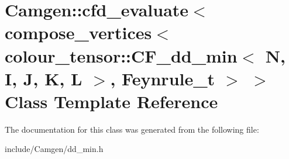 \hypertarget{a00049}{\section{Camgen\-:\-:cfd\-\_\-evaluate$<$ compose\-\_\-vertices$<$ colour\-\_\-tensor\-:\-:C\-F\-\_\-dd\-\_\-min$<$ N, I, J, K, L $>$, Feynrule\-\_\-t $>$ $>$ Class Template Reference}
\label{a00049}
}


The documentation for this class was generated from the following file\-:\begin{DoxyCompactItemize}
\item 
include/\-Camgen/dd\-\_\-min.\-h\end{DoxyCompactItemize}
